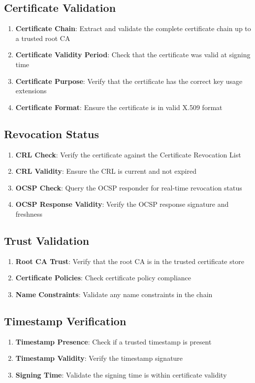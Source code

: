 \documentclass[12pt,a4paper]{article}
\begin{document}
\subsection{Certificate Validation}
\begin{enumerate}
    \item \textbf{Certificate Chain}: Extract and validate the complete certificate chain up to a trusted root CA
    \item \textbf{Certificate Validity Period}: Check that the certificate was valid at signing time
    \item \textbf{Certificate Purpose}: Verify that the certificate has the correct key usage extensions
    \item \textbf{Certificate Format}: Ensure the certificate is in valid X.509 format
\end{enumerate}

\subsection{Revocation Status}
\begin{enumerate}
    \item \textbf{CRL Check}: Verify the certificate against the Certificate Revocation List
    \item \textbf{CRL Validity}: Ensure the CRL is current and not expired
    \item \textbf{OCSP Check}: Query the OCSP responder for real-time revocation status
    \item \textbf{OCSP Response Validity}: Verify the OCSP response signature and freshness
\end{enumerate}

\subsection{Trust Validation}
\begin{enumerate}
    \item \textbf{Root CA Trust}: Verify that the root CA is in the trusted certificate store
    \item \textbf{Certificate Policies}: Check certificate policy compliance
    \item \textbf{Name Constraints}: Validate any name constraints in the chain
\end{enumerate}

\subsection{Timestamp Verification}
\begin{enumerate}
    \item \textbf{Timestamp Presence}: Check if a trusted timestamp is present
    \item \textbf{Timestamp Validity}: Verify the timestamp signature
    \item \textbf{Signing Time}: Validate the signing time is within certificate validity
\end{enumerate}
\end{document}
